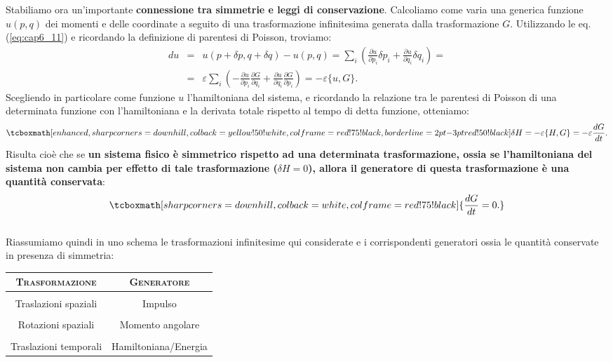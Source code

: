 Stabiliamo ora un'importante \textbf{connessione tra simmetrie e leggi di conservazione}. Calcoliamo come varia una generica funzione $u(p,q)$ dei momenti e delle coordinate a seguito di una trasformazione infinitesima generata dalla trasformazione $G$. Utilizzando le eq. (\ref{eq:cap6_11}) e ricordando la definizione di parentesi di Poisson, troviamo:
	\begin{eqnarray}
		du & = & u(p+\delta p , q+\delta q )- u (p,q) = \sum _i \left( \frac{\partial u}{\partial p_i} \delta p_i + \frac{\partial u}{\partial q_i } \delta q_i \right) = \nonumber \\
		&=& \varepsilon \sum _i \left( -\frac{\partial u}{\partial p_i} \frac{\partial G}{\partial q_i} + \frac{\partial u}{\partial q_i } \frac{\partial G}{\partial p_i} \right) =-\varepsilon \{ u, G \} .
	\end{eqnarray}
Scegliendo in particolare come funzione $u$ l'hamiltoniana del sistema,  e ricordando la relazione tra le parentesi di Poisson di una determinata funzione con l'hamiltoniana e la derivata totale rispetto al tempo di detta funzione, otteniamo:
	\begin{equation}
		\tcboxmath[enhanced,sharp corners=downhill ,colback=yellow!50!white,colframe=red!75!black, borderline={2pt}{-3pt}{red!50!black}]{
			\delta H = -\varepsilon \{H,G\} = -\varepsilon \frac{dG}{dt}.
			}
	\end{equation}
Risulta cioè che se \textbf{un sistema fisico è simmetrico rispetto ad una determinata trasformazione, ossia se l'hamiltoniana del sistema non cambia per effetto di tale trasformazione ($\delta H =0$), allora il generatore di questa trasformazione è una quantità conservata}:
	\begin{equation}
		\tcboxmath[sharp corners=downhill ,colback=white,colframe=red!75!black]{
			\frac{dG}{dt}=0.
			}
	\end{equation}\\
	
Riassumiamo quindi in uno schema le trasformazioni infinitesime qui considerate e i corrispondenti generatori ossia le quantità conservate in presenza di simmetria:

\begin{table}[!htbp]
\begin{center}
\begin{tabular}{c|c}
\textbf{\textsc{Trasformazione}} & \textbf{\textsc{Generatore}}\\
\hline \\
Traslazioni spaziali & Impulso \\
\hline \\
Rotazioni spaziali & Momento angolare \\
\hline \\
Traslazioni temporali &  Hamiltoniana/Energia \\
\hline 
\end{tabular}
\end{center}
\end{table}
